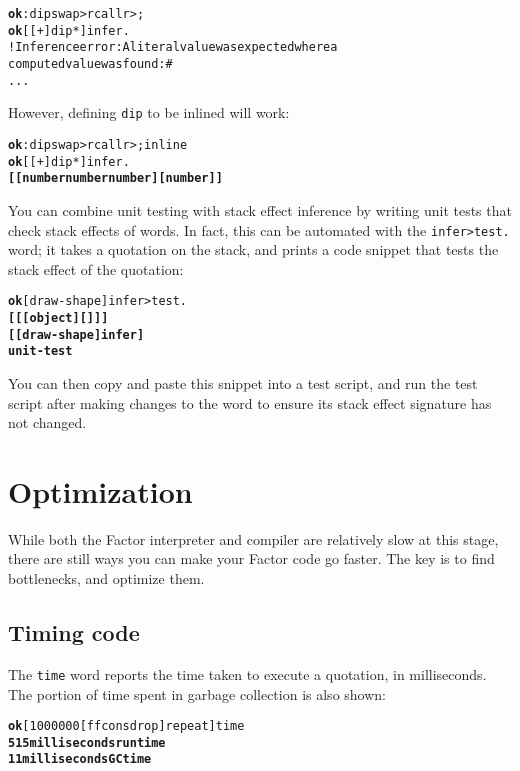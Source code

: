 \documentclass{report}
\begin{document}
\begin{alltt}
\textbf{ok} : dip swap >r call r> ;
\textbf{ok} [ [ + ] dip * ] infer .
! Inference error: A literal value was expected where a
computed value was found: \#<computed @ 679711507>
...
\end{alltt}

However, defining \texttt{dip} to be inlined will work:

\begin{alltt}
\textbf{ok} : dip swap >r call r> ; inline
\textbf{ok} [ [ + ] dip * ] infer .
\textbf{[ [ number number number ] [ number ] ]}
\end{alltt}

You can combine unit testing with stack effect inference by writing unit tests that check stack effects of words. In fact, this can be automated with the \texttt{infer>test.} word; it takes a quotation on the stack, and prints a code snippet that tests the stack effect of the quotation:

\begin{alltt}
\textbf{ok} [ draw-shape ] infer>test.
\textbf{[ [ [ object ] [  ] ] ]
[ [ draw-shape ] infer ]
unit-test}
\end{alltt}

You can then copy and paste this snippet into a test script, and run the test script after
making changes to the word to ensure its stack effect signature has not changed.

\section{Optimization}

While both the Factor interpreter and compiler are relatively slow at this stage, there
are still ways you can make your Factor code go faster. The key is to find bottlenecks,
and optimize them.

\subsection{Timing code}

The \texttt{time} word reports the time taken to execute a quotation, in milliseconds. The portion of time spent in garbage collection is also shown:

\begin{alltt}
\textbf{ok} [ 1000000 [ f f cons drop ] repeat ] time
\textbf{515 milliseconds run time
11 milliseconds GC time}
\end{alltt}
\end{document}
